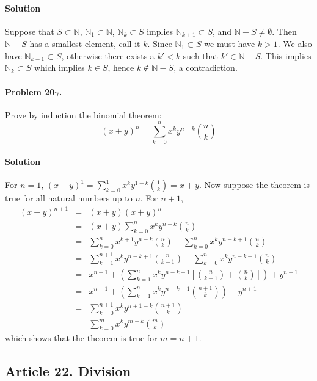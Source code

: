 \paragraph*{Solution}
Suppose that $ S \subset \mathbb{N}$, $ \mathbb{N}_1 \subset \mathbb{N} $,
$\mathbb{N}_k \subset S $ implies $\mathbb{N}_{k+1} \subset S $, and $ \mathbb{N} - S
\neq \emptyset $. Then $ \mathbb{N} - S $ has a smallest element, call it $k$.
Since $\mathbb{N}_1 \subset S$  we must have $k > 1$.
We also have $ \mathbb{N}_{k-1} \subset S $, otherwise there exists a $k' < k$ such
that $k' \in \mathbb{N} - S$. This implies $ \mathbb{N}_k \subset S$ which
implies $ k \in S $, hence $ k \notin \mathbb{N} - S$, a contradiction.

\paragraph{Problem 20$\gamma$.}
Prove by induction the binomial theorem:
$$ (x+y)^n = \sum_{k=0}^n x^k y^{n-k} {{n}\choose{k}} $$

\paragraph*{Solution}
For $n = 1$, $(x+y)^1 = \sum_{k=0}^1 x^k y^{1-k} {{1}\choose{k}} = x+y$.
Now suppose the theorem is true for all natural numbers up to $n$.
For $n+1$,
\begin{eqnarray*}
(x+y)^{n+1} &=& (x+y)(x+y)^n \\
&=& (x+y) \sum_{k=0}^n x^k y^{n-k} {{n}\choose{k}} \\
&=& \sum_{k=0}^n x^{k+1} y^{n-k} {{n}\choose{k}} + \sum_{k=0}^n x^k y^{n-k+1} {{n}\choose{k}} \\
&=& \sum_{k=1}^{n+1} x^k y^{n-k+1} {{n}\choose{k-1}} + \sum_{k=0}^n x^k y^{n-k+1} {{n}\choose{k}} \\
&=& x^{n+1} + \left( \sum_{k=1}^n x^k y^{n-k+1} \left[ {{n}\choose{k-1}} + {{n}\choose{k}} \right] \right) + y^{n+1} \\
&=& x^{n+1} + \left( \sum_{k=1}^n x^k y^{n-k+1} {{n+1}\choose{k}} \right) + y^{n+1} \\
&=& \sum_{k=0}^{n+1} x^k y^{n+1-k} {{n+1}\choose{k}} \\
&=& \sum_{k=0}^m x^k y^{m-k} {{m}\choose{k}}
\end{eqnarray*}
which shows that the theorem is true for $m = n+1$.

\subsection{Article 22. Division}


